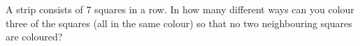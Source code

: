 A strip consists of $7$ squares in a row. In how many different ways can you colour three of the squares (all in the same colour) so that no two neighbouring squares are coloured?
